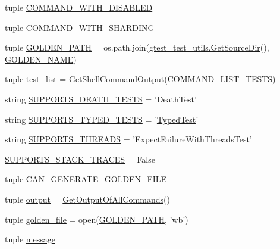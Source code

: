 \begin{DoxyCompactItemize}
tuple \hyperlink{namespacegtest__output__test_a0ef963a39dc8e53616ba2dab9f128def}{C\-O\-M\-M\-A\-N\-D\-\_\-\-W\-I\-T\-H\-\_\-\-D\-I\-S\-A\-B\-L\-E\-D}
\item 
tuple \hyperlink{namespacegtest__output__test_a462eef2a00782001d491b7a38a847bec}{C\-O\-M\-M\-A\-N\-D\-\_\-\-W\-I\-T\-H\-\_\-\-S\-H\-A\-R\-D\-I\-N\-G}
\item 
tuple \hyperlink{namespacegtest__output__test_ad37256f6954485deb074fd47ba08e84b}{G\-O\-L\-D\-E\-N\-\_\-\-P\-A\-T\-H} = os.\-path.\-join(\hyperlink{namespacegtest__test__utils_a61bdad46f079ed13d9102f8a8c13ea18}{gtest\-\_\-test\-\_\-utils.\-Get\-Source\-Dir}(), \hyperlink{namespacegtest__output__test_a317ece7d11d9103a7bdbf0320b64a981}{G\-O\-L\-D\-E\-N\-\_\-\-N\-A\-M\-E})
\item 
tuple \hyperlink{namespacegtest__output__test_a2da84cfb32bbb8634f1f5853795d6051}{test\-\_\-list} = \hyperlink{namespacegtest__output__test_a52d428b680879fbe96182f7db8ae738e}{Get\-Shell\-Command\-Output}(\hyperlink{namespacegtest__output__test_ad57de209fb07e1002c8a929dd8a15dc9}{C\-O\-M\-M\-A\-N\-D\-\_\-\-L\-I\-S\-T\-\_\-\-T\-E\-S\-T\-S})
\item 
string \hyperlink{namespacegtest__output__test_a401e837dae10d6c728bd74684884a77f}{S\-U\-P\-P\-O\-R\-T\-S\-\_\-\-D\-E\-A\-T\-H\-\_\-\-T\-E\-S\-T\-S} = 'Death\-Test'
\item 
string \hyperlink{namespacegtest__output__test_aa762abdf62ac6efe1aa2405b3f506380}{S\-U\-P\-P\-O\-R\-T\-S\-\_\-\-T\-Y\-P\-E\-D\-\_\-\-T\-E\-S\-T\-S} = '\hyperlink{class_typed_test}{Typed\-Test}'
\item 
string \hyperlink{namespacegtest__output__test_a9c611ee196914defbb5d32a47c606640}{S\-U\-P\-P\-O\-R\-T\-S\-\_\-\-T\-H\-R\-E\-A\-D\-S} = 'Expect\-Failure\-With\-Threads\-Test'
\item 
\hyperlink{namespacegtest__output__test_a0bab477a98b8f74922a43ca21f4fca13}{S\-U\-P\-P\-O\-R\-T\-S\-\_\-\-S\-T\-A\-C\-K\-\_\-\-T\-R\-A\-C\-E\-S} = False
\item 
tuple \hyperlink{namespacegtest__output__test_aa370a0da630f54a564d79507df196854}{C\-A\-N\-\_\-\-G\-E\-N\-E\-R\-A\-T\-E\-\_\-\-G\-O\-L\-D\-E\-N\-\_\-\-F\-I\-L\-E}
\item 
tuple \hyperlink{namespacegtest__output__test_a7d428bb6e16eda248484d1428715858b}{output} = \hyperlink{namespacegtest__output__test_a9d3e73851ab6b1d226fc584036025839}{Get\-Output\-Of\-All\-Commands}()
\item 
tuple \hyperlink{namespacegtest__output__test_ae163d7a6ccbd6e49abe6982a89c3bca9}{golden\-\_\-file} = open(\hyperlink{namespacegtest__output__test_ad37256f6954485deb074fd47ba08e84b}{G\-O\-L\-D\-E\-N\-\_\-\-P\-A\-T\-H}, 'wb')
\item 
tuple \hyperlink{namespacegtest__output__test_ac696d0798ad7d08cb2e61070824750e2}{message}
\end{DoxyCompactItemize}



